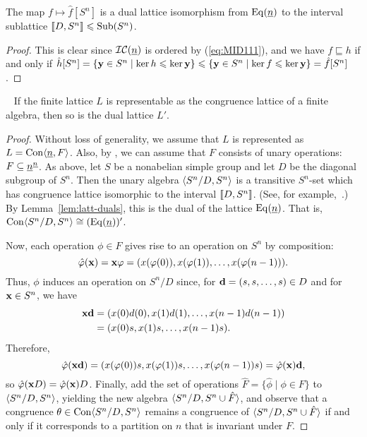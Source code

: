 \begin{lemma}
  \label{lem:latt-duals}
  The map $f \mapsto \hat{f}[S^n]$ is a dual lattice isomorphism from $\operatorname{Eq}(\underline{n})$
  to the interval sublattice $\llbracket D, S^n\rrbracket \leqslant \operatorname{Sub}(S^n)$.
\end{lemma}
\begin{proof}
  This is clear since $\mathcal{IC}(\underline{n})$ is ordered by (\ref{eq:MID111}), and 
  we have 
  $f\sqsubseteq h$ if and only if
  $\hat{h}[S^n] = \{\mathbf{y} \in S^n \mid \ker h \leqslant \ker \mathbf{y} \}
  \leqslant \{\mathbf{y} \in S^n \mid \ker f \leqslant \ker \mathbf{y} \} =  \hat{f}[S^n]$.
\end{proof}

\begin{theorem}\
  \label{thm:duals-interv-subl}
  If the finite lattice $L$ is representable as the congruence lattice of a
  finite algebra, then so is the dual lattice $L'$.
\end{theorem}
\begin{proof}
  Without loss of generality, we assume that $L$ is represented
  as $L = \operatorname{Con} \langle\underline{n}, F\rangle$.
  Also, by \cite[Theorem~4.18]{alvi:1987}, we can assume
  that $F$ consists of unary operations: $F \subseteq \underline{n}^{\underline{n}}$.  
  As above, let $S$ be a nonabelian simple group
  and let $D$ be the diagonal subgroup of $S^n$.
  Then the unary algebra $\langle S^n/D, S^n\rangle$  is a transitive $S^n$-set which
  has congruence lattice isomorphic to the interval $\llbracket D, S^n\rrbracket$.
  (See, for example,~\cite[Lemma~4.20]{alvi:1987}.)
  By Lemma~\ref{lem:latt-duals}, this is the dual
  of the lattice $\operatorname{Eq}(\underline{n})$.  That is, 
  $\operatorname{Con} \langle S^n/D, S^n\rangle \cong (\operatorname{Eq}(\underline{n}))'$.
  
  Now, each operation $\phi \in F$ gives rise to an operation on $S^n$
  by composition:
  \[
  \hat{\phi}(\bx) =  \bx \phi = %
  (x(\phi(0)), x(\phi(1)),\dots, x(\phi(n-1))). 
  \]
  Thus, $\phi$ induces an operation on $S^n/D$ since, for 
  $\mathbf{d} = (s, s, \dots, s) \in D$ and for $\mathbf{x} \in S^n$, we have
  \begin{align*}
  \mathbf{x} \mathbf{d} &= (x(0)d(0), x(1)d(1), \dots , x(n-1)d(n-1))\\
  &= (x(0)s, x(1)s, \dots , x(n-1)s).
  \end{align*}
  Therefore,
  \[\hat{\varphi}(\mathbf{x} \mathbf{d}) =(x (\varphi(0)) s, x(\varphi(1))s, \dots , x(\varphi(n-1))s)=
  \hat{\varphi}(\mathbf{x}) \mathbf{d},\]
  so $\hat{\varphi}(\mathbf{x} D)  = \hat{\varphi}(\mathbf{x}) D$.  Finally, add the set of operations 
  $\hat{F} = \{\hat{\phi} \mid \phi \in F\}$ to $\langle S^n/D, S^n\rangle$, yielding the
  new algebra  $\langle S^n/D, S^n \cup \hat{F}\rangle$, and observe
  that a congruence $\theta \in \operatorname{Con}\langle S^n/D, S^n\rangle$ remains a congruence of
  $\langle S^n/D, S^n \cup \hat{F}\rangle$ if and only if it corresponds to a partition on
  $n$ that is invariant under $F$.
\end{proof}

